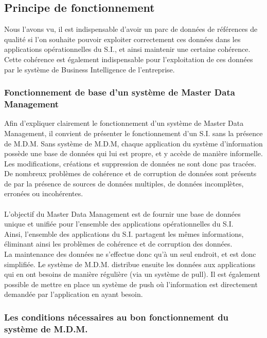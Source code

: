 \subsection{Principe de fonctionnement}

Nous l'avons vu, il est indispensable d'avoir un parc de données de références de qualité si l'on souhaite pouvoir exploiter correctement ces données dans les applications opérationnelles du S.I., et ainsi maintenir une certaine cohérence. Cette cohérence est également indispensable pour l'exploitation de ces données par le système de Business Intelligence de l'entreprise.\\

\subsubsection{Fonctionnement de base d'un système de Master Data Management}

Afin d'expliquer clairement le fonctionnement d'un système de Master Data Management, il convient de présenter le fonctionnement d'un S.I. sans la présence de M.D.M.
Sans système de M.D.M, chaque application du système d'information possède une base de données qui lui est propre, et y accède de manière informelle.
Les modifications, créations et suppression de données ne sont donc pas tracées. De nombreux problèmes de cohérence et de corruption de données sont présents de par la présence de sources de données multiples, de données incomplètes, erronées ou incohérentes.\\\\

L'objectif du Master Data Management est de fournir une base de données unique et unifiée  pour l'ensemble des applications opérationnelles du S.I.\\
Ainsi, l'ensemble des applications du S.I. partagent les mêmes informations, éliminant ainsi les problèmes de cohérence et de corruption des données.\\
La maintenance des données ne s'effectue donc qu'à un seul endroit, et est donc simplifiée. Le système de M.D.M. distribue ensuite les données aux applications qui en ont besoins de manière régulière (via un système de pull). Il est également possible de mettre en place un système de push où l'information est directement demandée par l'application en ayant besoin.

\subsubsection{Les conditions nécessaires au bon fonctionnement du système de M.D.M.}

